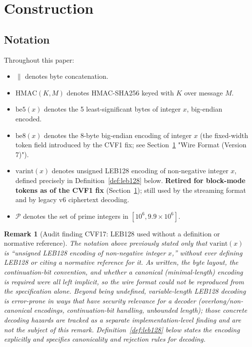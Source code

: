 \documentclass[11pt,a4paper]{article}
\newtheorem{remark}[theorem]{Remark}
\begin{document}
\section{Construction}
\label{sec:construction}

\subsection{Notation}

Throughout this paper:
\begin{itemize}
  \item $\|$ denotes byte concatenation.
  \item $\mathrm{HMAC}(K, M)$ denotes HMAC-SHA256 keyed with $K$ over message $M$.
  \item $\mathrm{be5}(x)$ denotes the 5 least-significant bytes of integer $x$,
        big-endian encoded.
  \item $\mathrm{be8}(x)$ denotes the 8-byte big-endian encoding of integer $x$
        (the fixed-width token field introduced by the CVF1 fix; see
        Section~\ref{sec:construction} "Wire Format (Version 7)").
  \item $\mathrm{varint}(x)$ denotes unsigned LEB128 encoding of non-negative
        integer $x$, defined precisely in Definition~\ref{def:leb128} below.
        \textbf{Retired for block-mode tokens as of the CVF1 fix}
        (Section~\ref{sec:construction}); still used by the streaming format
        and by legacy v6 ciphertext decoding.
  \item $\mathcal{P}$ denotes the set of prime integers in $[10^6, 9.9 \times 10^6]$.
\end{itemize}

\begin{remark}[Audit finding CVF17: LEB128 used without a definition or normative reference]
\label{rem:cvf17}
The notation above previously stated only that $\mathrm{varint}(x)$ is
``unsigned LEB128 encoding of non-negative integer $x$,'' without ever
defining LEB128 or citing a normative reference for it. As written, the
byte layout, the continuation-bit convention, and whether a canonical
(minimal-length) encoding is required were all left implicit, so the wire
format could not be reproduced from the specification alone. Beyond being
undefined, variable-length LEB128 decoding is error-prone in ways that
have security relevance for a decoder (overlong/non-canonical encodings,
continuation-bit handling, unbounded length); those concrete decoding
hazards are tracked as a separate implementation-level finding and are not
the subject of this remark. Definition~\ref{def:leb128} below states the
encoding explicitly and specifies canonicality and rejection rules for
decoding.
\end{remark}
\end{document}
